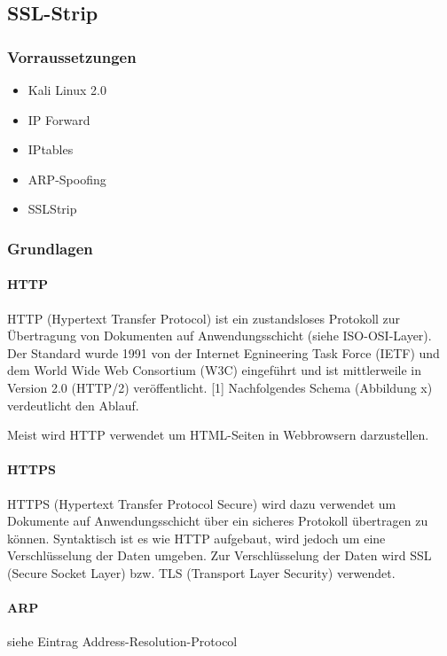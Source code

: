 \subsection{SSL-Strip}

\subsubsection*{Vorraussetzungen}

\begin{itemize}
\item Kali Linux 2.0
\item IP Forward
\item IPtables
\item ARP-Spoofing
\item SSLStrip
\end{itemize}


\subsubsection*{Grundlagen}

\paragraph*{HTTP}
HTTP (Hypertext Transfer Protocol) ist ein zustandsloses Protokoll zur Übertragung von Dokumenten auf Anwendungsschicht (siehe ISO-OSI-Layer). Der Standard wurde 1991 von der Internet Egnineering
Task Force (IETF) und dem World Wide Web Consortium (W3C) eingeführt und ist mittlerweile in Version 2.0 (HTTP/2) veröffentlicht. [1]
Nachfolgendes Schema (Abbildung x) verdeutlicht den Ablauf.

Meist wird HTTP verwendet um HTML-Seiten in Webbrowsern darzustellen.

\paragraph*{HTTPS}
HTTPS (Hypertext Transfer Protocol Secure) wird dazu verwendet um Dokumente auf Anwendungsschicht über ein sicheres Protokoll übertragen zu können. Syntaktisch ist es wie HTTP aufgebaut,
 wird jedoch um eine Verschlüsselung der Daten umgeben. Zur Verschlüsselung der Daten wird SSL (Secure Socket Layer) bzw. TLS (Transport Layer Security) verwendet.

\paragraph*{ARP}
siehe Eintrag Address-Resolution-Protocol

